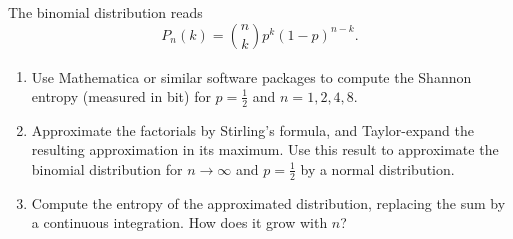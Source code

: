 \begin{Problem}
The binomial distribution reads
\[
P_n(k)=\binom{n}{k}p^k(1-p)^{n-k}.
\]

\begin{enumerate}
\item[(a)] Use Mathematica\textsuperscript{\textregistered} or similar software packages to compute the Shannon entropy (measured in bit) for $p=\frac12$ and $n=1,2,4,8$.

\item[(b)] Approximate the factorials by Stirling's formula, and Taylor-expand the resulting approximation in its maximum. Use this result to approximate the binomial distribution for $n\to\infty$ and $p=\frac12$ by a normal distribution.

\item[(c)] Compute the entropy of the approximated distribution, replacing the sum by a continuous integration. How does it grow with \(n\)?
\end{enumerate}
\end{Problem}

